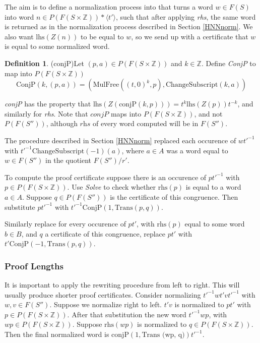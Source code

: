 \documentclass[11pt]{article} %
\theoremstyle{definition}
\theoremstyle{definition}
\theoremstyle{definition}
\theoremstyle{definition}
\theoremstyle{definition}
\newtheorem{defn}[theorem]{Definition}
\theoremstyle{definition}
\begin{document}
The aim is to define a normalization process into that turns a word $w \in F(S)$ into
word $n \in P(F(S \times \mathbb{Z})) \ast \langle t' \rangle$,
such that after applying \textit{rhs}, the same word is returned as in the
normalization process described in Section \ref{HNNnorm}. We also want
$\text{lhs}(Z(n))$ to be equal to $w$, so we send up with a certificate that $w$
is equal to some normalized word.

\begin{defn}(conjP)\label{conjP}
  Let $(p, a) \in P(F(S \times \mathbb{Z}))$ and $k \in \mathbb{Z}$.
  Define \textit{ConjP} to map into $P(F(S \times \mathbb{Z}))$
  \begin{equation}
    \text{ConjP}(k, (p, a)) = (\text{MulFree}((t,0)^k, p), \text{ChangeSubscript}(k, a))
  \end{equation}
\end{defn}

\textit{conjP} has the property that $\text{lhs}(Z(\text{conjP}(k, p))) = t^k \text{lhs}(Z(p))t^{-k}$,
and similarly for \textit{rhs}. Note that $\textit{conjP}$ maps into $P(F(S \times \mathbb{Z}))$,
and not $P(F(S''))$, although $\textit{rhs}$ of every word computed
will be in $F(S'')$.

The procedure described in Section \ref{HNNnorm}
replaced each occurence of $wt'^{-1}$ with \newline $t'^{-1}\text{ChangeSubscript}(-1)(a)$,
where $a \in A$ was a word equal to $w \in F(S'')$ in the quotient
$F(S'') / r'$.

To compute the proof certificate suppose there is an occurence of $pt'^{-1}$ with
$p \in P(F(S \times \mathbb{Z}))$. Use \textit{Solve} to check whether $\text{rhs}(p)$ is
equal to a word $a \in A$. Suppose $q \in  P(F(S''))$ is the certificate
of this congruence. Then substitute $pt'^{-1}$ with $t'^{-1}\text{ConjP}(1, \text{Trans}(p, q))$.

Similarly replace for every occurence of $pt'$, with $\text{rhs}(p)$ equal to some word $b \in B$,
and $q$ a certificate of this congruence, replace $pt'$ with $t'\text{ConjP}(-1, \text{Trans}(p, q))$.

\subsubsection{Proof Lengths}

It is important to apply the rewriting procedure from left to right. This will usually
produce shorter proof certificates. Consider normalizing $t'^{-1}wt'vt'^{-1}$ with $w, v \in F(S'')$.
Suppose we normalize right to left.
$t'v$ is normalized to $pt'$ with $p \in P(F(S \times \mathbb{Z}))$.
After that substitution the new word $t'^{-1}wp$, with $wp \in P(F(S \times \mathbb{Z}))$.
Suppose $\text{rhs}(wp)$ is normalized to $q \in P(F(S \times \mathbb{Z}))$.
Then the final normalized word is $\text{conjP}(1, \text{Trans (wp, q)})t'^{-1}$.
\end{document}
